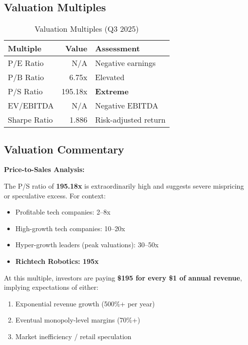 \documentclass[11pt,a4paper]{article}
\begin{document}
\subsection{Valuation Multiples}

\begin{table}[h]
\centering
\begin{tabular}{lrl}
\toprule
\textbf{Multiple} & \textbf{Value} & \textbf{Assessment} \\
\midrule
P/E Ratio & N/A & Negative earnings \\
P/B Ratio & 6.75x & \textcolor{neutral}{Elevated} \\
P/S Ratio & 195.18x & \textcolor{bearish}{\textbf{Extreme}} \\
EV/EBITDA & N/A & Negative EBITDA \\
\midrule
Sharpe Ratio & 1.886 & Risk-adjusted return \\
\bottomrule
\end{tabular}
\caption{Valuation Multiples (Q3 2025)}
\end{table}

\subsection{Valuation Commentary}

\textbf{Price-to-Sales Analysis:}

The P/S ratio of \textbf{195.18x} is extraordinarily high and suggests severe mispricing or speculative excess. For context:

\begin{itemize}[itemsep=2pt]
    \item Profitable tech companies: 2--8x
    \item High-growth tech companies: 10--20x
    \item Hyper-growth leaders (peak valuations): 30--50x
    \item \textbf{Richtech Robotics: 195x}
\end{itemize}

At this multiple, investors are paying \textbf{\$195 for every \$1 of annual revenue}, implying expectations of either:
\begin{enumerate}
    \item Exponential revenue growth (500\%+ per year)
    \item Eventual monopoly-level margins (70\%+)
    \item Market inefficiency / retail speculation
\end{enumerate}
\end{document}
